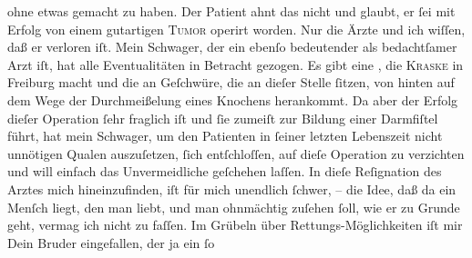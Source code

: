 \begin{ledgroupsized}[t]{13cm}
               ohne etwas gemacht zu haben. Der Patient ahnt das nicht und glaubt, er ſei mit Erfolg von einem gutartigen
                  \textsc{Tumor} operirt worden. Nur die Ärzte und ich wiſſen, daß
               er verloren iſt. {\pb}Mein Schwager, der ein ebenſo bedeutender als
               bedachtſamer Arzt iſt, hat alle Eventualitäten in Betracht gezogen. Es gibt eine
                  \label{K-L03243-2v}\label{K-L03243-2h}, die \textsc{Kraske} in Freiburg macht und die an Geſchwüre, die
               an dieſer Stelle ſitzen, von hinten auf dem Wege der Durchmeißelung eines Knochens
               herankommt. Da aber der Erfolg dieſer Operation ſehr fraglich iſt und ſie zumeiſt zur
               Bildung einer Darmfiſtel führt, hat mein Schwager, um den Patienten in ſeiner letzten Lebenszeit nicht unnötigen Qualen
               auszuſetzen, ſich entſchloſſen, auf dieſe Operation zu verzichten und will einfach
               das Unvermeidliche geſchehen laſſen.\pend
           \pstart
           In dieſe Reſignation des Arztes {\pb}mich hineinzufinden, iſt für mich
               unendlich ſchwer, – die Idee, daß da ein Menſch liegt, den man liebt, und man  ohnmächtig zuſehen ſoll, wie er zu Grunde geht, vermag ich nicht zu
               faſſen. Im Grübeln über Rettungs-Möglichkeiten iſt mir Dein Bruder eingefallen, der ja ein ſo

\end{ledgroupsized}
